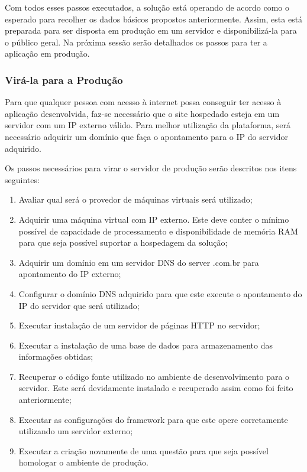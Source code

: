 Com todos esses passos executados, a solução está operando de acordo como o esperado para recolher os dados básicos propostos anteriormente.
Assim, esta está preparada para ser disposta em produção em um servidor e disponibilizá-la para o público geral. Na próxima sessão serão
detalhados os passos para ter a aplicação em produção.

\subsubsection{Virá-la para a Produção}
\label{sub:definir_tecnologia}
Para que qualquer pessoa com acesso à internet possa conseguir ter acesso à aplicação desenvolvida, faz-se necessário que
o site hospedado esteja em um servidor com um IP externo válido. Para melhor utilização da plataforma, será necessário adquirir um domínio
que faça o apontamento para o IP do servidor adquirido. 

Os passos necessários para virar o servidor de produção serão descritos nos itens seguintes:

\begin{enumerate}
    \item Avaliar qual será o provedor de máquinas virtuais será utilizado;
    \item Adquirir uma máquina virtual com IP externo. Este deve conter o mínimo possível de capacidade de processamento e
        disponibilidade de memória RAM para que seja possível suportar a hospedagem da solução;
    \item Adquirir um domínio em um servidor DNS do server .com.br para apontamento do IP externo;
    \item Configurar o domínio DNS adquirido para que este execute o apontamento do IP do servidor que será utilizado;
    \item Executar instalação de um servidor de páginas HTTP no servidor;
    \item Executar a instalação de uma base de dados para armazenamento das informações obtidas;
    \item Recuperar o código fonte utilizado no ambiente de desenvolvimento para o servidor. Este será devidamente
        instalado e recuperado assim como foi feito anteriormente;
    \item Executar as configurações do framework para que este opere corretamente utilizando um servidor externo;
    \item Executar a criação novamente de uma questão para que seja possível homologar o ambiente de produção.
\end{enumerate}

